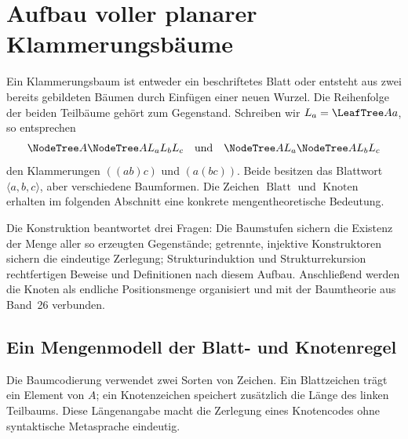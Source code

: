 \documentclass[main.tex]{subfiles}
\begin{document}
\chapter{Aufbau voller planarer Klammerungsbäume}

Ein Klammerungsbaum ist entweder ein beschriftetes Blatt oder entsteht
aus zwei bereits gebildeten Bäumen durch Einfügen einer neuen Wurzel.
Die Reihenfolge der beiden Teilbäume gehört zum Gegenstand. Schreiben wir
\(L_a=\LeafTree A a\), so entsprechen
\[
 \NodeTree A{\NodeTree A{L_a}{L_b}}{L_c}
 \quad\text{und}\quad
 \NodeTree A{L_a}{\NodeTree A{L_b}{L_c}}
\]
den Klammerungen \(((ab)c)\) und \((a(bc))\). Beide besitzen das
Blattwort \(\langle a,b,c\rangle\), aber verschiedene Baumformen.
Die Zeichen \(\operatorname{Blatt}\) und \(\operatorname{Knoten}\)
erhalten im folgenden Abschnitt eine konkrete mengentheoretische Bedeutung.



Die Konstruktion beantwortet drei Fragen: Die Baumstufen sichern die
Existenz der Menge aller so erzeugten Gegenstände; getrennte, injektive
Konstruktoren sichern die eindeutige Zerlegung; Strukturinduktion und
Strukturrekursion rechtfertigen Beweise und Definitionen nach diesem
Aufbau. Anschließend werden die Knoten als endliche Positionsmenge
organisiert und mit der Baumtheorie aus Band~26 verbunden.

\section{Ein Mengenmodell der Blatt- und Knotenregel}

Die Baumcodierung verwendet zwei Sorten von Zeichen. Ein Blattzeichen trägt
ein Element von \(A\); ein Knotenzeichen speichert zusätzlich die Länge des
linken Teilbaums. Diese Längenangabe macht die Zerlegung eines Knotencodes
ohne syntaktische Metasprache eindeutig.


\end{document}
